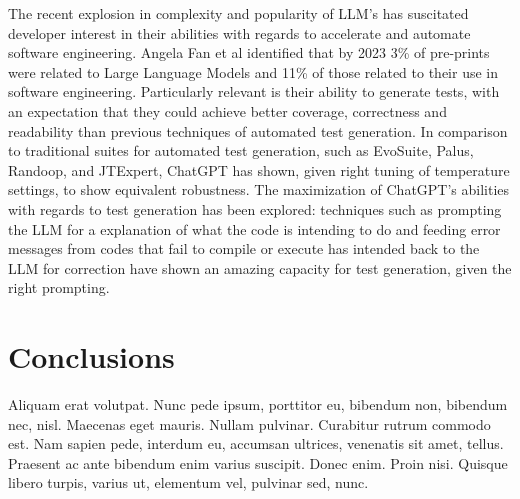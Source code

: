 The recent explosion in complexity and popularity of LLM's has suscitated developer interest in their abilities with regards to accelerate and automate software engineering. Angela Fan et al identified that by 2023 3\% of pre-prints were related to Large Language Models and 11\% of those related to their use in software engineering.\cite{kn:angela} Particularly relevant is their ability to generate tests, with an expectation that they could achieve better coverage, correctness and readability than previous techniques of automated test generation.\cite{kn:junjiewang}
In comparison to traditional suites for automated test generation, such as EvoSuite, Palus, Randoop, and JTExpert, ChatGPT has shown, given right tuning of temperature settings, to show equivalent robustness.\cite{kn:gptunitbra}
The maximization of ChatGPT's abilities with regards to test generation has been explored: techniques such as prompting the LLM for a explanation of what the code is intending to do \cite{kn:nuances} and feeding error messages from codes that fail to compile or execute has intended back to the LLM for correction \cite{kn:chattester} have shown an amazing capacity for test generation, given the right prompting.


\section{Conclusions}

Aliquam erat volutpat. Nunc pede ipsum, porttitor eu, bibendum non,
bibendum nec, nisl. Maecenas eget mauris. Nullam pulvinar. Curabitur
rutrum commodo est. Nam sapien pede, interdum eu, accumsan ultrices,
venenatis sit amet, tellus. Praesent ac ante bibendum enim varius
suscipit. Donec enim. Proin nisi. Quisque libero turpis, varius ut,
elementum vel, pulvinar sed, nunc. 
